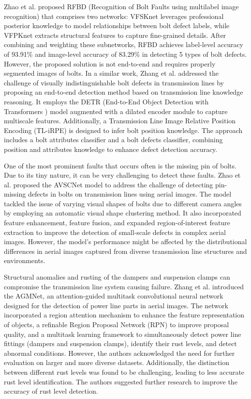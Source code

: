 Zhao et al. \cite{zhao_new_2022} proposed RFBD (Recognition of Bolt Faults using multilabel image recognition) that comprises two networks: VFSKnet leverages professional posterior knowledge to model relationships between bolt defect labels, while VFPKnet extracts structural features to capture fine-grained details. After combining and weighting these subnetworks, RFBD achieves label-level accuracy of 93.91\% and image-level accuracy of 83.29\% in detecting 5 types of bolt defects. However, the proposed solution is not end-to-end and requires properly segmented images of bolts. In a similar work, Zhang et al. \cite{zhang_pa_detr_2023} addressed the challenge of visually indistinguishable bolt defects in transmission lines by proposing an end-to-end detection method based on transmission line knowledge reasoning. It employs the DETR (End-to-End Object Detection with Transformers ) \cite{carion2020end} model augmented with a dilated encoder module to capture multiscale features. Additionally, a Transmission Line Image Relative Position Encoding (TL-iRPE) is designed to infer bolt position knowledge. The approach includes a bolt attributes classifier and a bolt defects classifier, combining position and attributes knowledge to enhance defect detection accuracy.

One of the most prominent faults that occurs often is the missing pin of bolts. Due to its tiny nature, it can be very challenging to detect these faults. Zhao et al. \cite{zhao_detection_2020} proposed the AVSCNet model to address the challenge of detecting pin-missing defects in bolts on transmission lines using aerial images. The model tackled the issue of varying visual shapes of bolts due to different camera angles by employing an automatic visual shape clustering method. It also incorporated feature enhancement, feature fusion, and expanded region-of-interest feature extraction to improve the detection of small-scale defects in complex aerial images. However, the model's performance might be affected by the distributional differences in aerial images captured from diverse transmission line structures and environments.

Structural anomalies and rusting of the dampers and suspension clamps can compromise the transmission line system causing failure. Zhang et al. \cite{zhang_attention_guided_2022} introduced the AGMNet, an attention-guided multitask convolutional neural network designed for the detection of power line parts in aerial images. The network incorporated a region attention mechanism to enhance the feature representation of objects, a refinable Region Proposal Network (RPN) to improve proposal quality, and a multitask learning framework to simultaneously detect power line fittings (dampers and suspension clamps), identify their rust levels, and detect abnormal conditions. However, the authors acknowledged the need for further evaluation on larger and more diverse datasets. Additionally, the distinction between different rust levels was found to be challenging, leading to less accurate rust level identification. The authors suggested further research to improve the accuracy of rust level detection.  


